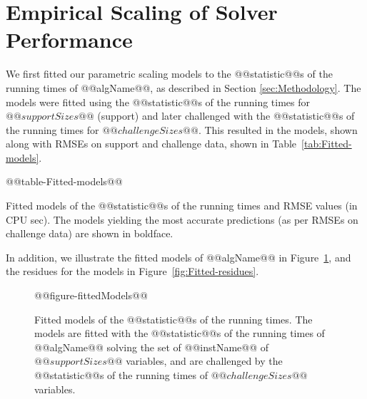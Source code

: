 % 
% 
% 
% 

\section{Empirical Scaling of Solver Performance}

\label{sec:Results}

We first fitted our parametric scaling models to the @@statistic@@s of the  running times
of @@algName@@, as described in Section \ref{sec:Methodology}. The
models were fitted using the @@statistic@@s of the  running times for $@@supportSizes@@$
(support) and later challenged with the @@statistic@@s of the  running times for $@@challengeSizes@@$.
This resulted in the models, shown along with RMSEs on support and
challenge data, shown in Table~\ref{tab:Fitted-models}.
\begin{table}[tb]
\begin{centering}
@@table-Fitted-models@@
% 
\par\end{centering}

\caption{\label{tab:Fitted-models}Fitted models of the @@statistic@@s of the  running times and RMSE
values (in CPU sec). The models yielding the most
accurate predictions (as per RMSEs on challenge data) are shown in
boldface.}
\end{table}
In addition, we illustrate the fitted models of @@algName@@ in Figure~\ref{fig:Fitted-models},
and the residues for the models in Figure~\ref{fig:Fitted-residues}.
\begin{figure}[tb]
\noindent \begin{centering}
@@figure-fittedModels@@
\par\end{centering}

\caption{\label{fig:Fitted-models} Fitted models of the @@statistic@@s of the  running times. 
The models are fitted with the @@statistic@@s of the  running times of
@@algName@@ solving the set of @@instName@@ 
of $@@supportSizes@@$ variables, and are challenged by the @@statistic@@s of the 
running times of $@@challengeSizes@@$ variables.}
\end{figure}


